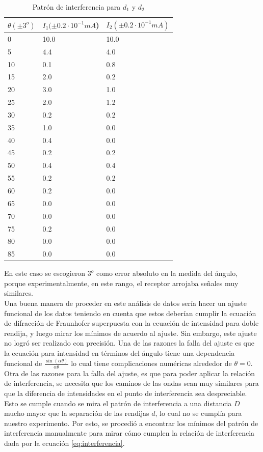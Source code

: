 \documentclass[prb,aps,twocolumn,preprintnumbers,amsmath,amssymb]{revtex4}
\begin{document}
\begin{table}[h!]
	\caption{\label{table:inter}Patrón de interferencia para $d_1$ y $d_2$}
	\begin{ruledtabular}
	\begin{tabular}{|M{2.5cm}|M{2.5cm}|M{2.5cm}|}
		$ \theta (\pm 3^o) $ & $ I_1(\pm 0.2\cdot 10^{-1}mA  $) &$ I_2(\pm 0.2\cdot 10^{-1}mA)  $  \\ 
		  &  10.0 & 10.0\\
		5  &  4.4 & 4.0\\
		10 &  0.1 & 0.8\\
		15 &  2.0 & 0.2\\
		20 &  3.0 & 1.0\\ 
		25 &  2.0 & 1.2\\ 
		30 &  0.2 & 0.2\\ 
		35 &  1.0 & 0.0\\ 
		40 &  0.4 & 0.0\\ 
		45 &  0.2 & 0.2\\ 
		50 &  0.4 & 0.4\\ 
		55 &  0.2 & 0.2\\ 
		60 &  0.2 & 0.0\\ 
		65 &  0.0 & 0.0\\ 
		70 &  0.0 & 0.0\\ 
		75 &  0.2 & 0.0\\ 
		80 &  0.0 & 0.0\\ 
		85 &  0.0 & 0.0\\ 
	\end{tabular} 
	\end{ruledtabular} 
\end{table}

En este caso se escogieron $3^o$ como error absoluto en la medida del ángulo, porque experimentalmente, en este rango, el receptor arrojaba señales muy similares.\\

Una buena manera de proceder en este análisis de datos sería hacer un ajuste funcional de los datos teniendo en cuenta que estos deberían cumplir la ecuación de difracción de Fraunhofer superpuesta con la ecuación de intensidad para doble rendija, y luego mirar los mínimos de acuerdo al ajuste. Sin embargo, este ajuste no logró ser realizado con precisión. Una de las razones la falla del ajuste es que la ecuación para intensidad en términos del ángulo tiene una dependencia funcional de $\frac{\sin{(\alpha \theta)}}{\alpha\theta}$ lo cual tiene complicaciones numéricas alrededor de $\theta= 0$. Otra de las razones para la falla del ajuste, es que para poder aplicar la relación de interferencia, se necesita que los caminos de las ondas sean muy similares para que la diferencia de intensidades en el punto de interferencia sea despreciable. Esto se cumple cuando se mira el patrón de interferencia a una distancia $D$ mucho mayor que la separación de las rendijas $d$, lo cual no se cumplía para nuestro experimento. Por esto, se procedió a encontrar los mínimos del patrón de interferencia manualmente para mirar cómo cumplen la relación de interferencia dada por la ecuación \eqref{eq:interferencia}.\\
\end{document}
